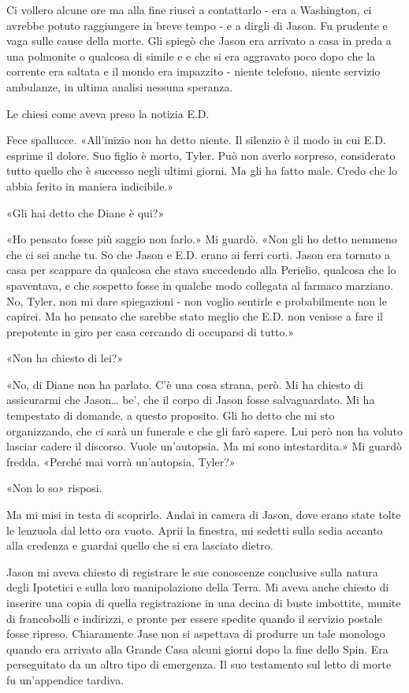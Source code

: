 Ci vollero alcune ore ma alla fine riuscì a contattarlo - era a
Washington, ci avrebbe potuto raggiungere in breve tempo - e a dirgli di
Jason. Fu prudente e vaga sulle cause della morte. Gli spiegò che Jason
era arrivato a casa in preda a una polmonite o qualcosa di simile e e
che si era aggravato poco dopo che la corrente era saltata e il mondo
era impazzito - niente telefono, niente servizio ambulanze, in ultima
analisi nessuna speranza.

Le chiesi come aveva preso la notizia E.D.

Fece spallucce. «All'inizio non ha detto niente. Il silenzio è il modo
in cui E.D. esprime il dolore. Suo figlio è morto, Tyler. Può non averlo
sorpreso, considerato tutto quello che è successo negli ultimi giorni.
Ma gli ha fatto male. Credo che lo abbia ferito in maniera indicibile.»

«Gli hai detto che Diane è qui?»

«Ho pensato fosse più saggio non farlo.» Mi guardò. «Non gli ho detto
nemmeno che ci sei anche tu. So che Jason e E.D. erano ai ferri corti.
Jason era tornato a casa per scappare da qualcosa che stava succedendo
alla Perielio, qualcosa che lo spaventava, e che sospetto fosse in
qualche modo collegata al farmaco marziano. No, Tyler, non mi dare
spiegazioni - non voglio sentirle e probabilmente non le capirei. Ma ho
pensato che sarebbe stato meglio che E.D. non venisse a fare il
prepotente in giro per casa cercando di occuparsi di tutto.»

«Non ha chiesto di lei?»

«No, di Diane non ha parlato. C'è una cosa strana, però. Mi ha chiesto
di assicurarmi che Jason\ldots{} be', che il corpo di Jason fosse
salvaguardato. Mi ha tempestato di domande, a questo proposito. Gli ho
detto che mi sto organizzando, che ci sarà un funerale e che gli farò
sapere. Lui però non ha voluto lasciar cadere il discorso. Vuole
un'autopsia. Ma mi sono intestardita.» Mi guardò fredda. «Perché mai
vorrà un'autopsia, Tyler?»

«Non lo so» risposi.

Ma mi misi in testa di scoprirlo. Andai in camera di Jason, dove erano
state tolte le lenzuola dal letto ora vuoto. Aprii la finestra, mi
sedetti sulla sedia accanto alla credenza e guardai quello che si era
lasciato dietro.

Jason mi aveva chiesto di registrare le sue conoscenze conclusive sulla
natura degli Ipotetici e sulla loro manipolazione della Terra. Mi aveva
anche chiesto di inserire una copia di quella registrazione in una
decina di buste imbottite, munite di francobolli e indirizzi, e pronte
per essere spedite quando il servizio postale fosse ripreso. Chiaramente
Jase non si aspettava di produrre un tale monologo quando era arrivato
alla Grande Casa alcuni giorni dopo la fine dello Spin. Era perseguitato
da un altro tipo di emergenza. Il suo testamento sul letto di morte fu
un'appendice tardiva.

